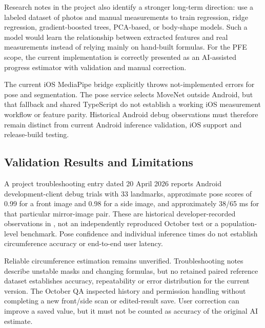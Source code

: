 \documentclass[12pt,a4paper,openany]{report}
\begin{document}
Research notes in the project also identify a stronger long-term direction: use a labeled dataset of photos and manual measurements to train regression, ridge regression, gradient-boosted trees, PCA-based, or body-shape models. Such a model would learn the relationship between extracted features and real measurements instead of relying mainly on hand-built formulas. For the PFE scope, the current implementation is correctly presented as an AI-assisted progress estimator with validation and manual correction.


The current iOS MediaPipe bridge explicitly throws not-implemented errors for pose and segmentation. The pose service selects MoveNet outside Android, but that fallback and shared TypeScript do not establish a working iOS measurement workflow or feature parity. Historical Android debug observations must therefore remain distinct from current Android inference validation, iOS support and release-build testing.

\subsection{Validation Results and Limitations}

A project troubleshooting entry dated 20 April 2026 reports Android development-client debug trials with 33 landmarks, approximate pose scores of 0.99 for a front image and 0.98 for a side image, and approximately 38/65 ms for that particular mirror-image pair. These are historical developer-recorded observations in , not an independently reproduced October test or a population-level benchmark. Pose confidence and individual inference times do not establish circumference accuracy or end-to-end user latency.


Reliable circumference estimation remains unverified. Troubleshooting notes describe unstable masks and changing formulas, but no retained paired reference dataset establishes accuracy, repeatability or error distribution for the current version. The October QA inspected history and permission handling without completing a new front/side scan or edited-result save. User correction can improve a saved value, but it must not be counted as accuracy of the original AI estimate.
\end{document}
